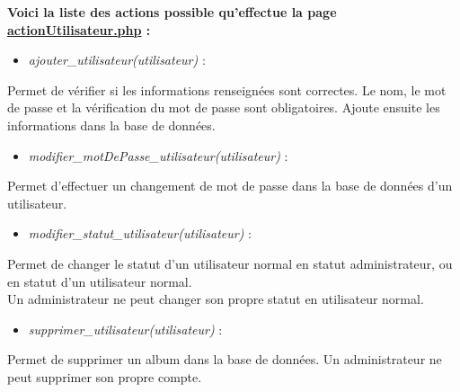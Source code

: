 			\begin{paragraphe}
                \textbf{Voici la liste des actions possible qu'effectue la page \underline{actionUtilisateur.php} :}
            
                \begin{itemize}
                    \item \emph{ajouter\_utilisateur(utilisateur)} :
                \end{itemize}
                \begin{paragraphe}
                    Permet de vérifier si les informations renseignées sont correctes. Le nom, le mot de passe et la vérification du mot de passe sont obligatoires. Ajoute ensuite les informations dans la base de données.
                \end{paragraphe}
                
                \begin{itemize}
                    \item \emph{modifier\_motDePasse\_utilisateur(utilisateur)} :
                \end{itemize}
                \begin{paragraphe}
                    Permet d'effectuer un changement de mot de passe dans la base de données d'un utilisateur.
                \end{paragraphe}
                
                \begin{itemize}
                    \item \emph{modifier\_statut\_utilisateur(utilisateur)} :
                \end{itemize}
                \begin{paragraphe}
                    Permet de changer le statut d'un utilisateur normal en statut administrateur, ou en statut d'un utilisateur normal. \\
                    Un administrateur ne peut changer son propre statut en utilisateur normal.
                \end{paragraphe}
                
                \begin{itemize}
                    \item \emph{supprimer\_utilisateur(utilisateur)} :
                \end{itemize}
                \begin{paragraphe}
                    Permet de supprimer un album dans la base de données.
                    Un administrateur ne peut supprimer son propre compte.
                \end{paragraphe}
            \end{paragraphe}

